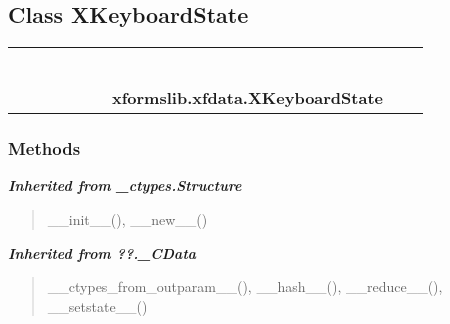 
\subsection{Class XKeyboardState}

    \label{xformslib:xfdata:XKeyboardState}
\begin{tabular}{cccccccccc}
\multicolumn{2}{r}{\settowidth{\BCL}{object}\multirow{2}{\BCL}{object}}
&&
&&
&&
  \\\cline{3-3}
  &&\multicolumn{1}{c|}{}
&&
&&
&&
  \\
\multicolumn{4}{r}{\settowidth{\BCL}{??.\_CData}\multirow{2}{\BCL}{??.\_CData}}
&&
&&
  \\\cline{5-5}
  &&&&\multicolumn{1}{c|}{}
&&
&&
  \\
\multicolumn{6}{r}{\settowidth{\BCL}{\_ctypes.Structure}\multirow{2}{\BCL}{\_ctypes.Structure}}
&&
  \\\cline{7-7}
  &&&&&&\multicolumn{1}{c|}{}
&&
  \\
&&&&&&\multicolumn{2}{l}{\textbf{xformslib.xfdata.XKeyboardState}}
\end{tabular}



  \subsubsection{Methods}


\large{\textbf{\textit{Inherited from \_ctypes.Structure}}}

\begin{quote}
\_\_init\_\_(), \_\_new\_\_()
\end{quote}

\large{\textbf{\textit{Inherited from ??.\_CData}}}

\begin{quote}
\_\_ctypes\_from\_outparam\_\_(), \_\_hash\_\_(), \_\_reduce\_\_(), \_\_setstate\_\_()
\end{quote}

